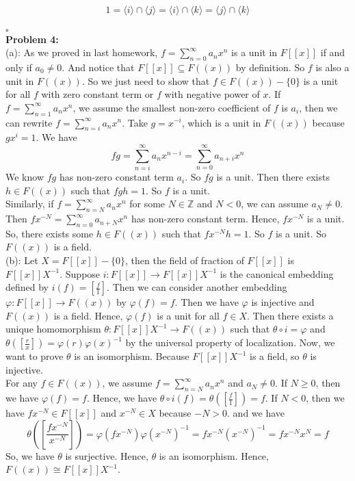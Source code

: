 \documentclass[12pt]{amsart}
\newcommand{\Z}{\mathbb{Z}}
\begin{document}
$$1=\langle i\rangle\cap\langle j\rangle=\langle i\rangle\cap\langle k\rangle=\langle j\rangle\cap\langle k\rangle$$
\\\phantom{qed}\hfill$\square$\\
\textbf{Problem 4:}\\
(a): As we proved in last homework, $f=\sum_{n=0}^\infty a_nx^n$ is a unit in $F[[x]]$ if and only if $a_0\neq 0$. And notice that $F[[x]]\subseteq F((x))$ by definition. So $f$ is also a unit in $F((x))$. So we just need to show that $f\in F((x))-\{0\}$ is a unit for all $f$ with zero constant term or $f$ with negative power of $x$. If $f=\sum_{n=1}^\infty a_nx^n$, we assume the smallest non-zero coefficient of $f$ is $a_i$, then we can rewrite $f=\sum_{n=i}^\infty a_nx^n$. Take $g=x^{-i}$, which is a unit in $F((x))$ because $gx^i=1$. We have 
\[fg=\sum_{n=i}^\infty a_nx^{n-i}=\sum_{n=0}^\infty a_{n+i}x^n\]
We know $fg$ has non-zero constant term $a_i$. So $fg$ is a unit. Then there exists $h\in F((x))$ such that $fgh=1$. So $f$ is a unit.\\
Similarly, if $f=\sum_{n=N}^\infty a_nx^n$ for some $N\in \Z$ and $N<0$, we can assume $a_N\neq 0$. Then $fx^{-N}=\sum_{n=0}^\infty a_{n+N}x^n$ has non-zero constant term. Hence, $fx^{-N}$ is a unit. So, there exists some $h\in F((x))$ such that $fx^{-N}h=1$. So $f$ is a unit. So $F((x))$ is a field.\\
(b): Let $X=F[[x]]-\{0\}$, then the field of fraction of $F[[x]]$ is $F[[x]]X^{-1}$. Suppose $i:F[[x]]\to F[[x]]X^{-1}$ is the canonical embedding defined by $i(f)=[\frac{f}{1}]$. Then we can consider another embedding $\varphi:F[[x]]\to F((x))$ by $\varphi(f)=f$. Then we have $\varphi$ is injective and $F((x))$ is a field. Hence, $\varphi(f)$ is a unit for all $f\in X$. Then there exists a unique homomorphism $\theta:F[[x]]X^{-1}\to F((x))$ such that $\theta\circ i=\varphi$ and $\theta([\frac{r}{x}])=\varphi(r)\varphi(x)^{-1}$ by the universal property of localization. Now, we want to prove $\theta$ is an isomorphism. Because $F[[x]]X^{-1}$ is a field, so $\theta$ is injective. \\
For any $f\in F((x))$, we assume $f=\sum_{n=N}^\infty a_nx^n$ and $a_N\neq 0$. If $N\geq 0$, then we have $\varphi(f)=f$. Hence, we have $\theta\circ i(f)=\theta ([\frac{f}{1}])=f$. If $N<0$, then we have $fx^{-N}\in F[[x]]$ and $x^{-N}\in X$ because $-N> 0$. and we have 
$$\theta([\frac{fx^{-N} }{x^{-N}}])=\varphi(fx^{-N} )\varphi(x^{-N} )^{-1}=fx^{-N} (x^{-N})^{-1}=fx^{-N} x^N=f $$
So, we have $\theta$ is surjective. Hence, $\theta$ is an isomorphism. Hence, $F((x))\cong F[[x]]X^{-1}$.\\
\end{document}

